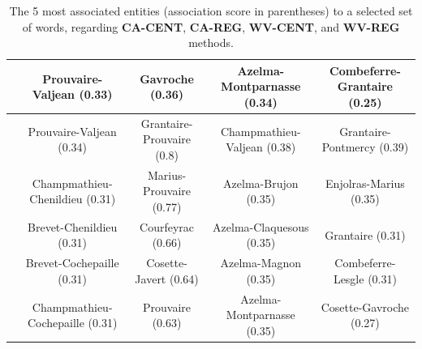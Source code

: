 \documentclass[
twocolumn,
]{ceurart}
\begin{document}
\begin{table}[!bh]
{\begin{tabular}{|c|c|c|c|c|}
		& Prouvaire-Valjean (0.33) & Gavroche (0.36) & Azelma-Montparnasse (0.34) & Combeferre-Grantaire (0.25) \\ 
		\hline
		\hline
		\parbox[t]{2mm}{} & Prouvaire-Valjean (0.34) & Grantaire-Prouvaire (0.8) & Champmathieu-Valjean (0.38) & Grantaire-Pontmercy (0.39) \\
		& Champmathieu-Chenildieu (0.31) & Marius-Prouvaire (0.77) & Azelma-Brujon (0.35) & Enjolras-Marius (0.35) \\
		& Brevet-Chenildieu (0.31) & Courfeyrac (0.66) & Azelma-Claquesous (0.35) & Grantaire (0.31) \\
		& Brevet-Cochepaille (0.31) & Cosette-Javert (0.64) & Azelma-Magnon (0.35) & Combeferre-Lesgle (0.31) \\
		& Champmathieu-Cochepaille (0.31) & Prouvaire (0.63) & Azelma-Montparnasse (0.35) & Cosette-Gavroche (0.27) \\ \hline
	\end{tabular}
	}
	\label{CA_CENT_obj_words}
	\caption{The 5 most associated entities (association score in parentheses) to a selected set of words, regarding \textbf{CA-CENT}, \textbf{CA-REG}, \textbf{WV-CENT}, and \textbf{WV-REG} methods.}
\end{table}


\end{document}
